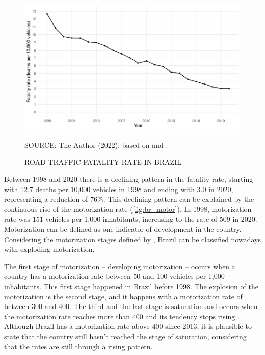 \begin{figure}[!htbp]
    \centering\footnotesize
    \captionsetup{font=footnotesize}
    \caption{ROAD TRAFFIC FATALITY RATE IN BRAZIL}
    \includegraphics{fig/brazil_fatality.pdf}
    \label{fig:br_fatal}
    \par SOURCE: The Author (2022), based on \textcite{MinistryofHealth2022} and \textcite{DENATRAN2020}.
\end{figure}                                

Between 1998 and 2020 there is a declining pattern in the fatality rate, starting with 12.7 deaths per 10,000 vehicles in 1998 and ending with 3.0 in 2020, representing a reduction of 76\%. This declining pattern can be explained by the continuous rise of the motorization rate (\autoref{fig:br_motor}). In 1998, motorization rate was 151 vehicles per 1,000 inhabitants, increasing to the rate of 509 in 2020. Motorization can be defined as one indicator of development in the country. Considering the motorization stages defined by \textcite{Jorgensen2005}, Brazil can be classified nowadays with exploding motorization. 

The first stage of motorization – developing motorization – occurs when a country has a motorization rate between 50 and 100 vehicles per 1,000 inhabitants. This first stage happened in Brazil before 1998. The explosion of the motorization is the second stage, and it happens with a motorization rate of between 300 and 400. The third and the last stage is saturation and occurs when the motorization rate reaches more than 400 and its tendency stops rising \cite{Jorgensen2005}. Although Brazil has a motorization rate above 400 since 2013, it is plausible to state that the country still hasn't reached the stage of saturation, considering that the rates are still through a rising pattern. 

